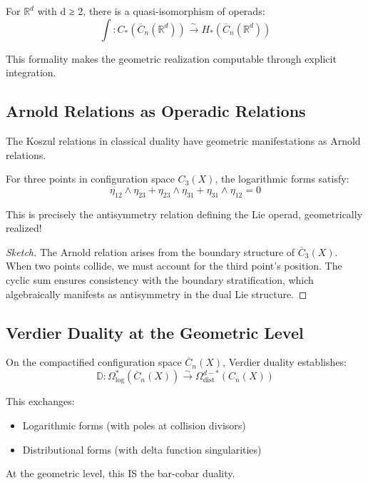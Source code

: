 \begin{theorem}\label{thm:kontsevich-formality}
For $\mathbb{R}^d$ with d ≥ 2, there is a quasi-isomorphism of operads:
$$\int: C_*(\overline{C}_n(\mathbb{R}^d)) \xrightarrow{\sim} H_*(\overline{C}_n(\mathbb{R}^d))$$

This formality makes the geometric realization computable through explicit integration.
\end{theorem}

\subsection{Arnold Relations as Operadic Relations}

\begin{proposition}\label{prop:arnold-koszul}
The Koszul relations in classical duality have geometric manifestations as Arnold relations.

For three points in configuration space $C_3(X)$, the logarithmic forms satisfy:
$$\eta_{12} \wedge \eta_{23} + \eta_{23} \wedge \eta_{31} + \eta_{31} \wedge \eta_{12} = 0$$

This is precisely the antisymmetry relation defining the Lie operad, geometrically realized!
\end{proposition}

\begin{proof}[Sketch]
The Arnold relation arises from the boundary structure of $\overline{C}_3(X)$. When two points collide, we must account for the third point's position. The cyclic sum ensures consistency with the boundary stratification, which algebraically manifests as antisymmetry in the dual Lie structure.
\end{proof}

\subsection{Verdier Duality at the Geometric Level}

\begin{theorem}\label{thm:verdier-config}
On the compactified configuration space $\overline{C}_n(X)$, Verdier duality establishes:
$$\mathbb{D}: \Omega^*_{\log}(\overline{C}_n(X)) \xrightarrow{\sim} \Omega^{d-*}_{\text{dist}}(C_n(X))$$

This exchanges:
\begin{itemize}
\item Logarithmic forms (with poles at collision divisors)
\item Distributional forms (with delta function singularities)
\end{itemize}

At the geometric level, this IS the bar-cobar duality.
\end{theorem}

